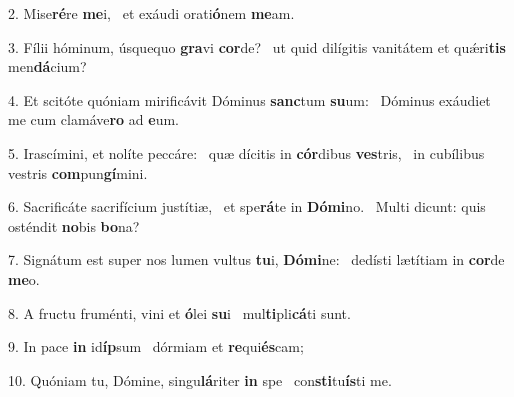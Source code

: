 2. Mise\textbf{ré}re \textbf{me}i, \ast\  et exáudi orati\textbf{ó}nem \textbf{me}am.\

3. Fílii hóminum, úsquequo \textbf{gra}vi \textbf{cor}de? \ast\  ut quid dilígitis vanitátem et quǽri\textbf{tis} men\textbf{dá}cium?\

4. Et scitóte quóniam mirificávit Dóminus \textbf{sanc}tum \textbf{su}um: \ast\  Dóminus exáudiet me cum clamáve\textbf{ro} ad \textbf{e}um.\

5. Irascímini, et nolíte peccáre: \dag\  quæ dícitis in \textbf{cór}dibus \textbf{ves}tris, \ast\  in cubílibus vestris \textbf{com}pun\textbf{gí}mini.\

6. Sacrificáte sacrifícium justítiæ, \dag\  et spe\textbf{rá}te in \textbf{Dó}\textbf{mi}no. \ast\  Multi dicunt: quis osténdit \textbf{no}bis \textbf{bo}na?\

7. Signátum est super nos lumen vultus \textbf{tu}i, \textbf{Dó}\textbf{mi}ne: \ast\  dedísti lætítiam in \textbf{cor}de \textbf{me}o.\

8. A fructu fruménti, vini et \textbf{ó}lei \textbf{su}i \ast\  mul\textbf{ti}pli\textbf{cá}ti sunt.\

9. In pace \textbf{in} id\textbf{íp}sum \ast\  dórmiam et \textbf{re}qui\textbf{és}cam;\

10. Quóniam tu, Dómine, singu\textbf{lá}riter \textbf{in} spe \ast\  con\textbf{sti}tu\textbf{ís}ti me.\

